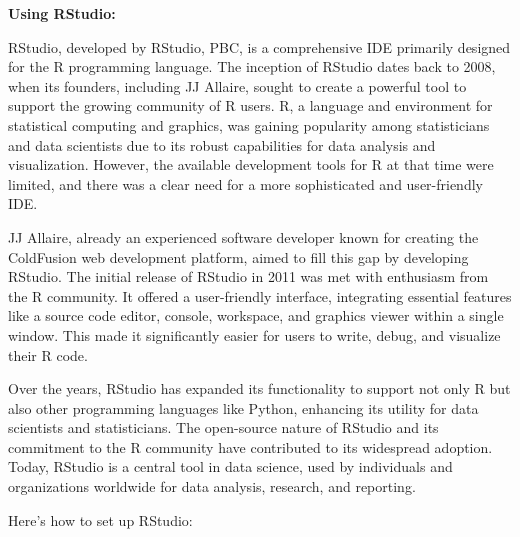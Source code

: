 \documentclass[
  letterpaper,
  DIV=11,
  numbers=noendperiod]{scrreprt}
\begin{document}
\textbf{Using RStudio:}

RStudio, developed by RStudio, PBC, is a comprehensive IDE primarily
designed for the R programming language. The inception of RStudio dates
back to 2008, when its founders, including JJ Allaire, sought to create
a powerful tool to support the growing community of R users. R, a
language and environment for statistical computing and graphics, was
gaining popularity among statisticians and data scientists due to its
robust capabilities for data analysis and visualization. However, the
available development tools for R at that time were limited, and there
was a clear need for a more sophisticated and user-friendly IDE.

JJ Allaire, already an experienced software developer known for creating
the ColdFusion web development platform, aimed to fill this gap by
developing RStudio. The initial release of RStudio in 2011 was met with
enthusiasm from the R community. It offered a user-friendly interface,
integrating essential features like a source code editor, console,
workspace, and graphics viewer within a single window. This made it
significantly easier for users to write, debug, and visualize their R
code.

Over the years, RStudio has expanded its functionality to support not
only R but also other programming languages like Python, enhancing its
utility for data scientists and statisticians. The open-source nature of
RStudio and its commitment to the R community have contributed to its
widespread adoption. Today, RStudio is a central tool in data science,
used by individuals and organizations worldwide for data analysis,
research, and reporting.

Here's how to set up RStudio:
\end{document}
